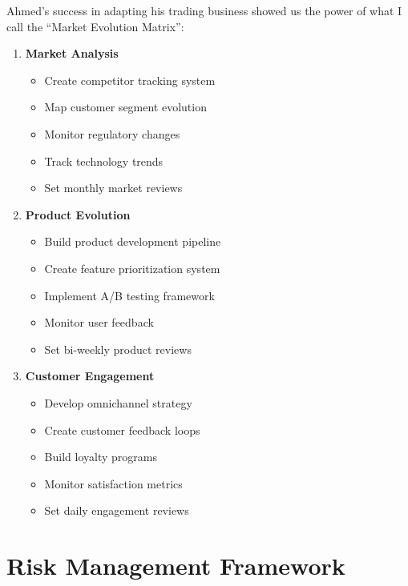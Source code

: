 Ahmed's success in adapting his trading business showed us the power of what I call the ``Market Evolution Matrix'':

\begin{tcolorbox}[colback=white,colframe=primarydark,title=\textbf{Market Positioning Steps}]
    \begin{enumerate}
        \item \textbf{Market Analysis}
        \begin{itemize}
            \item Create competitor tracking system
            \item Map customer segment evolution
            \item Monitor regulatory changes
            \item Track technology trends
            \item Set monthly market reviews
        \end{itemize}

        \item \textbf{Product Evolution}
        \begin{itemize}
            \item Build product development pipeline
            \item Create feature prioritization system
            \item Implement A/B testing framework
            \item Monitor user feedback
            \item Set bi-weekly product reviews
        \end{itemize}

        \item \textbf{Customer Engagement}
        \begin{itemize}
            \item Develop omnichannel strategy
            \item Create customer feedback loops
            \item Build loyalty programs
            \item Monitor satisfaction metrics
            \item Set daily engagement reviews
        \end{itemize}
    \end{enumerate}
\end{tcolorbox}


\section{Risk Management Framework}\label{sec:risk-management-framework}

